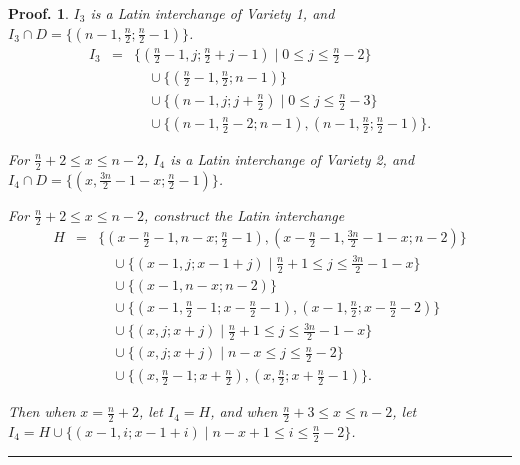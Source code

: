 \documentclass[12pt]{report}
\newtheorem{preproof}{{\bf Proof.}}
\newenvironment{proof}[1]{\begin{preproof}{\rm
               #1}\hfill{\rule[-0.5mm]{2mm}{2mm}}}{\end{preproof}}
\begin{document}
\begin{proof}
{\noindent $I_{3}$ is a Latin interchange of Variety 1, and $I_{3} \cap D = \{ ( n - 1, \displaystyle{\frac{n}{2}}; \displaystyle{\frac{n}{2}} - 1 ) \}$.
\begin{eqnarray*}
I_{3} & = & \{ ( \displaystyle{\frac{n}{2}} - 1, j; \displaystyle{\frac{n}{2}} + j - 1) \mid 0 \leq j \leq \displaystyle{\frac{n}{2}} - 2 \} \\
&& \quad{}\cup \{ ( \displaystyle{\frac{n}{2}} - 1, \displaystyle{\frac{n}{2}}; n - 1 ) \} \\
&& \quad{}\cup \{ (n - 1, j; j + \displaystyle{\frac{n}{2}} ) \mid 0 \leq j \leq \displaystyle{\frac{n}{2}} - 3\} \\
&& \quad{}\cup \{ (n - 1, \displaystyle{\frac{n}{2}} - 2; n - 1 ), (n - 1, \displaystyle{\frac{n}{2}}; \displaystyle{\frac{n}{2}} - 1 ) \}.
\end{eqnarray*}

\noindent For $\displaystyle{\frac{n}{2}} + 2 \leq x \leq n - 2$,
$I_{4}$ is a Latin interchange of Variety 2, and 
$I_{4} \cap D = \{ (x, \displaystyle{\frac{3n}{2}} - 1 - x; \displaystyle{\frac{n}{2}} - 1) \}$.

For $\displaystyle{\frac{n}{2}} + 2 \leq x \leq n - 2$, construct the Latin interchange
\begin{eqnarray*}
H & = &  \{ (x - \displaystyle{\frac{n}{2}} - 1, n - x; \displaystyle{\frac{n}{2}} - 1), (x - \displaystyle{\frac{n}{2}} - 1, \displaystyle{\frac{3n}{2}} - 1 - x; n - 2) \} \\
&& \quad{}\cup \{ (x - 1, j; x - 1 + j) \mid \displaystyle{\frac{n}{2}} + 1 \leq j \leq \displaystyle{\frac{3n}{2}} - 1 - x \} \\
&& \quad{}\cup \{ (x - 1, n - x; n - 2) \} \\
&& \quad{}\cup \{ (x - 1, \displaystyle{\frac{n}{2}}-1; x - \displaystyle{\frac{n}{2}} - 1), (x - 1, \displaystyle{\frac{n}{2}}; x - \displaystyle{\frac{n}{2}} - 2) \} \\
&& \quad{}\cup \{ (x, j; x + j) \mid \displaystyle{\frac{n}{2}} + 1 \leq j \leq \displaystyle{\frac{3n}{2}} - 1 - x \} \\ 
&& \quad{}\cup \{ (x, j; x + j) \mid n - x \leq j \leq \displaystyle{\frac{n}{2}} - 2 \} \\ 
&& \quad{}\cup \{ (x, \displaystyle{\frac{n}{2}} - 1; x + \displaystyle{\frac{n}{2}}), (x, \displaystyle{\frac{n}{2}}; x + \displaystyle{\frac{n}{2}} - 1) \}.
\end{eqnarray*}

Then when $x = \displaystyle{\frac{n}{2}} + 2$, let $I_{4} = H$, and when $\displaystyle{\frac{n}{2}} + 3
\leq x \leq n - 2$, let $I_{4} = H \cup \{ (x - 1, i; x - 1 + i) \mid n -
x + 1 \leq i \leq \displaystyle{\frac{n}{2}} - 2 \}$.

}
\end{proof}
\end{document}

